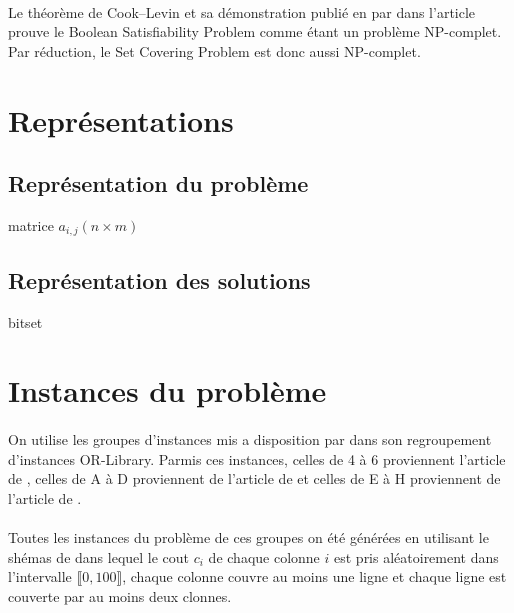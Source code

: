 \documentclass[12pt,letterpaper,twoside]{article}
\begin{document}
		\paragraph*{}
			Le théorème de Cook–Levin et sa démonstration publié en \citeyear{Cook1971} par \citeauthor{Cook1971} dans l'article \cite{Cook1971} prouve le Boolean Satisfiability Problem comme étant un problème NP-complet. Par réduction, le Set Covering Problem est donc aussi NP-complet.

	\section{Représentations}
		\subsection*{Représentation du problème}
			matrice \(a_{i,j} (n \times m)\)
		\subsection{Représentation des solutions}
			bitset

	\section{Instances du problème}
		\paragraph*{}
			On utilise les groupes d'instances mis a disposition par \citeauthor{OR-Library} dans son regroupement d'instances OR-Library\cite{OR-Library}. Parmis ces instances, celles de 4 à 6 proviennent l'article \cite{Balas1980} de \citeauthor{Balas1980}, celles de A à D proviennent de l'article \cite{Beasley1987} de \citeauthor{Beasley1987} et celles de E à H proviennent de l'article \cite{Beasley1990} de \citeauthor{Beasley1990}.
		\paragraph*{}
			Toutes les instances du problème de ces groupes on été générées en utilisant le shémas de \citeauthor{Balas1980}\cite{Balas1980} dans lequel le cout \(c_i\) de chaque colonne \(i\) est pris aléatoirement dans l'intervalle \(\llbracket0,100\rrbracket\), chaque colonne couvre au moins une ligne et chaque ligne est couverte par au moins deux clonnes.
\end{document}

